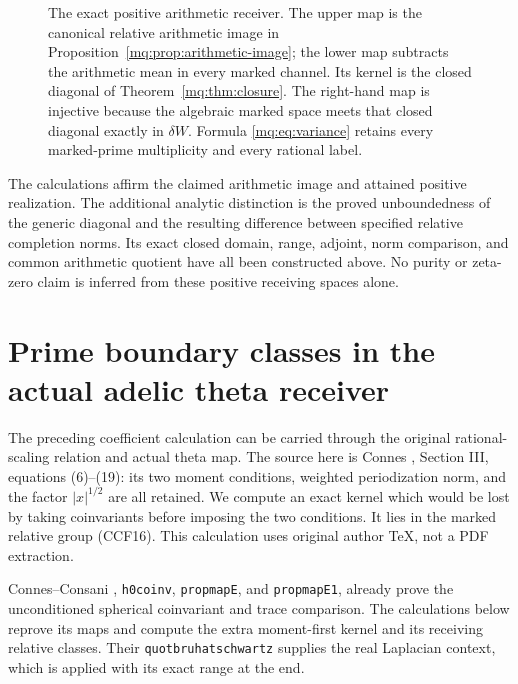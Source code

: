 \documentclass[11pt,a4paper]{article}
\theoremstyle{definition}\newtheorem{definition}[theorem]{Definition}
\begin{document}
\begin{figure}[ht]
\centering
{}
\caption{The exact positive arithmetic receiver. The upper map is
the canonical relative arithmetic image in
Proposition~\ref{mq:prop:arithmetic-image}; the lower map subtracts
the arithmetic mean in every marked channel. Its kernel is the
closed diagonal of Theorem~\ref{mq:thm:closure}. The right-hand map
is injective because the algebraic marked space meets that closed
diagonal exactly in $\delta W$. Formula \eqref{mq:eq:variance}
retains every marked-prime multiplicity and every rational label.}
\end{figure}

The calculations affirm the claimed arithmetic image and attained
positive realization. The additional analytic distinction is the
proved unboundedness of the generic diagonal and the resulting
difference between specified relative completion norms. Its exact
closed domain, range, adjoint, norm comparison, and common arithmetic
quotient have all been constructed above. No purity or zeta-zero
claim is inferred from these positive receiving spaces alone.


\section{Prime boundary classes in the actual adelic theta receiver}
\label{sec:prime-memory-theta}

The preceding coefficient calculation can be carried through the
original rational-scaling relation and actual theta map. The
source here is Connes \cite{Connes1998}, Section III, equations
(6)--(19): its two moment conditions, weighted periodization norm,
and the factor $|x|^{1/2}$ are all retained. We compute an exact
kernel which would be lost by taking coinvariants before imposing
the two conditions. It lies in the marked relative group (CCF16).
This calculation uses original author TeX, not a PDF extraction.

Connes--Consani \cite{ConnesConsaniHochschild},
\texttt{h0coinv}, \texttt{propmapE}, and \texttt{propmapE1},
already prove the unconditioned spherical coinvariant and trace
comparison. The calculations below reprove its maps and compute
the extra moment-first kernel and its receiving relative classes.
Their \texttt{quotbruhatschwartz} supplies the real Laplacian
context, which is applied with its exact range at the end.
\end{document}
